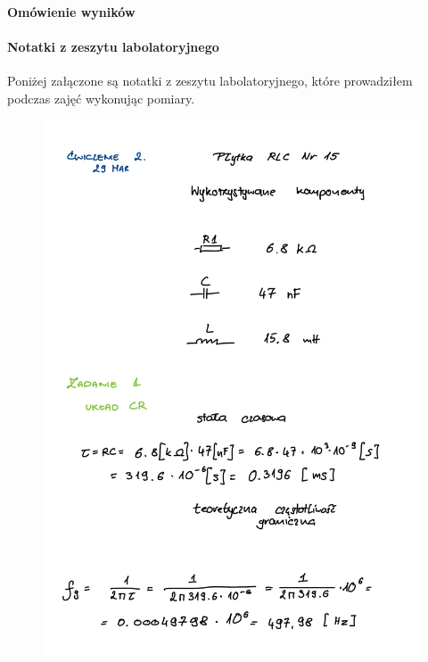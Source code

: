\documentclass[14pt, table]{extarticle}
\begin{document}
\newpage
\paragraph{Omówienie wyników \\}

\newpage
\paragraph{Notatki z zeszytu labolatoryjnego \\}
Poniżej załączone są notatki z zeszytu labolatoryjnego, które prowadziłem podczas zajęć wykonując pomiary.

\begin{figure}[H]
\includegraphics[scale=0.2]{B0}
\centering
\captionsetup{labelformat=empty}
\caption{}
\end{figure}
\end{document}
